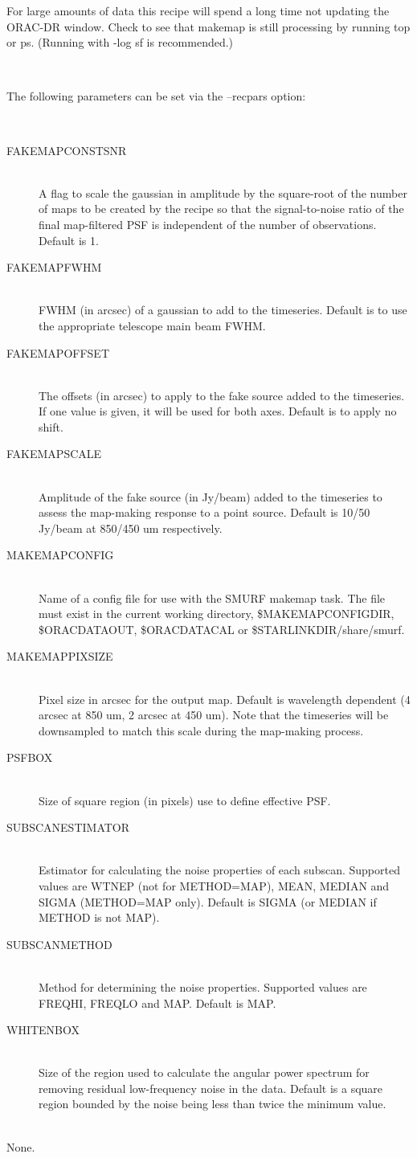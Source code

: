 \documentclass[twoside,11pt]{article}
\renewcommand{\_}{\texttt{\symbol{95}}}
\newcommand{\sstsubsection}[1]{ \item[{#1}] \mbox{} \\}
\newcommand{\sstdiytopic}[2]{\item[{\hspace{-0.35em}#1\hspace{-0.35em}:}]
\mbox{} \\[1.3ex] #2}
\newcommand{\sstdiylist}[2]{
   \item[#1:] \mbox{} \\
   \vspace{-3.5ex}
   \begin{description}
      #2
   \end{description}
}
\newcommand{\sstitem}{\item}
\newcommand{\sstsubsection}[1]{\item[{#1}]}
\newcommand{\sstdiytopic}[2]{\item[{#1}] #2 }
\newcommand{\sstitem}{\item}
\begin{document}
{{{         \sstitem
         For large amounts of data this recipe will spend a long time
         not updating the ORAC-DR window. Check to see that makemap is
         still processing by running top or ps. (Running with -log sf is
         recommended.)
      }
   }
   \sstdiylist{
      Available Parameters
   }{
      \sstsubsection{
         The following parameters can be set via the --recpars option:
      }{
      }
      \sstsubsection{
         FAKEMAP\_CONSTSNR
      }{
         A flag to scale the gaussian in amplitude by the square-root of
         the number of maps to be created by the recipe so that the
         signal-to-noise ratio of the final map-filtered PSF is
         independent of the number of observations. Default is 1.
      }
      \sstsubsection{
         FAKEMAP\_FWHM
      }{
         FWHM (in arcsec) of a gaussian to add to the timeseries.
         Default is to use the appropriate telescope main beam FWHM.
      }
      \sstsubsection{
         FAKEMAP\_OFFSET
      }{
         The offsets (in arcsec) to apply to the fake source added to
         the timeseries. If one value is given, it will be used for both
         axes. Default is to apply no shift.
      }
      \sstsubsection{
         FAKEMAP\_SCALE
      }{
         Amplitude of the fake source (in Jy/beam) added to the
         timeseries to assess the map-making response to a point source.
         Default is 10/50 Jy/beam at 850/450 um respectively.
      }
      \sstsubsection{
         MAKEMAP\_CONFIG
      }{
         Name of a config file for use with the SMURF makemap task. The
         file must exist in the current working directory,
         \$MAKEMAP\_CONFIG\_DIR, \$ORAC\_DATA\_OUT, \$ORAC\_DATA\_CAL or
         \$STARLINK\_DIR/share/smurf.
      }
      \sstsubsection{
         MAKEMAP\_PIXSIZE
      }{
         Pixel size in arcsec for the output map. Default is wavelength
         dependent (4 arcsec at 850 um, 2 arcsec at 450 um). Note that
         the timeseries will be downsampled to match this scale during
         the map-making process.
      }
      \sstsubsection{
         PSF\_BOX
      }{
         Size of square region (in pixels) use to define effective PSF.
      }
      \sstsubsection{
         SUBSCAN\_ESTIMATOR
      }{
         Estimator for calculating the noise properties of each subscan.
         Supported values are WTNEP (not for METHOD=MAP), MEAN, MEDIAN
         and SIGMA (METHOD=MAP only). Default is SIGMA (or MEDIAN if
         METHOD is not MAP).
      }
      \sstsubsection{
         SUBSCAN\_METHOD
      }{
         Method for determining the noise properties. Supported values
         are FREQHI, FREQLO and MAP. Default is MAP.
      }
      \sstsubsection{
         WHITEN\_BOX
      }{
         Size of the region used to calculate the angular power spectrum
         for removing residual low-frequency noise in the data. Default
         is a square region bounded by the noise being less than twice
         the minimum value.
      }
   }
   \sstdiytopic{
      Display
   }{
      None.
   }
}
\end{document}
